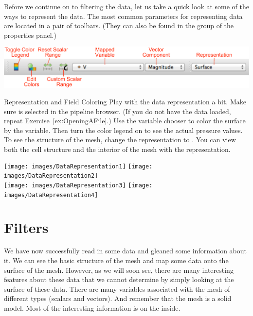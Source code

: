 Before we continue on to filtering the data, let us take a quick look at
some of the ways to represent the data.  The most common parameters for
representing data are located in a pair of toolbars. (They can also be
found in the  group of the properties panel.)

 

\begin{inlinefig}
  \includegraphics[width=\linewidth]{images/DataRepresentationToolbars}
\end{inlinefig}


\begin{exercise}{Representation and Field Coloring}
  \label{ex:RepresentationAndFieldColoring}%
  Play with the data representation a bit.  Make sure
   is selected in the pipeline browser.  (If you do
  not have the data loaded, repeat Exercise~\ref{ex:OpeningAFile}.)  Use
  the variable chooser to color the surface by the  variable.
  Then turn the color legend on to see the actual pressure values.  To see
  the structure of the mesh, change the representation to .  You can view both the cell structure and the interior of the
  mesh with the  representation.

  \begin{inlinefig}
    \texttt{[image: images/DataRepresentation1]}
    \texttt{[image: images/DataRepresentation2]} \\
    \texttt{[image: images/DataRepresentation3]}
    \texttt{[image: images/DataRepresentation4]}
  \end{inlinefig}
\end{exercise}



\section{Filters}


We have now successfully read in some data and gleaned some information
about it.  We can see the basic structure of the mesh and map some data
onto the surface of the mesh.  However, as we will soon see, there are many
interesting features about these data that we cannot determine by simply
looking at the surface of these data.  There are many variables associated
with the mesh of different types (scalars and vectors).  And remember that
the mesh is a solid model.  Most of the interesting information is on the
inside.

